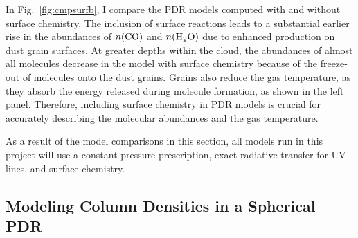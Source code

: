 \documentclass[12pt,a4paper]{article}
\newcommand{\mdpdr}{\texttt{MeudonPDR} code}
\begin{document}
In Fig.~\ref{fig:cmpsurfb}, I compare the PDR models computed with and without surface chemistry. The inclusion of surface reactions leads to a substantial earlier rise in the abundances of $n(\ce{CO})$ and $n(\ce{H2O})$ due to enhanced production on dust grain surfaces. At greater depths within the cloud, the abundances of almost all molecules decrease in the model with surface chemistry because of the freeze-out of molecules onto the dust grains. Grains also reduce the gas temperature, as they absorb the energy released during molecule formation, as shown in the left panel. Therefore, including surface chemistry in PDR models is crucial for accurately describing the molecular abundances and the gas temperature.


As a result of the model comparisons in this section, all models run in this project will use a constant pressure prescription, exact radiative transfer for  UV lines, and surface chemistry.

\subsection{Modeling Column Densities in a Spherical PDR} \label{sec:sphere}

\end{document}
